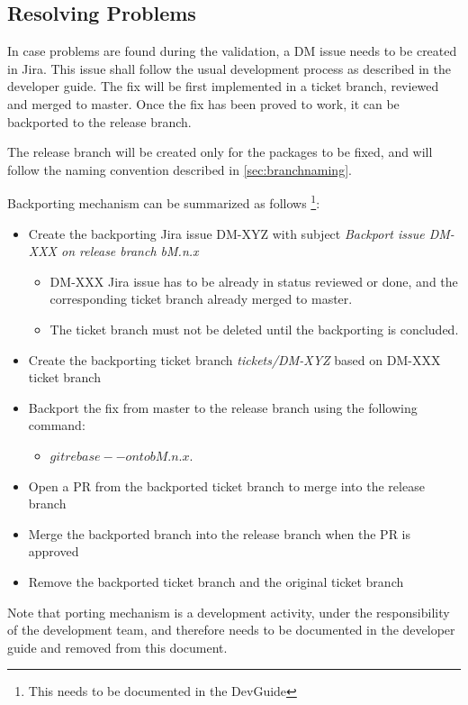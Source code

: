 \subsection{Resolving Problems}

In case problems are found during the validation, a DM issue needs to be created in Jira.
This issue shall follow the usual development process as described in the developer guide.
The fix will be first implemented in a ticket branch, reviewed and merged to master.
Once the fix has been proved to work, it can be backported to the release branch.

The release branch will be created only for the packages to be fixed, and will follow the naming convention described in \ref{sec:branchnaming}.

Backporting mechanism can be summarized as follows \footnote{This needs to be documented in the DevGuide}:


\begin{itemize}
\item Create the backporting Jira issue DM-XYZ with subject \textit{Backport issue DM-XXX on release branch bM.n.x}
  \begin{itemize}
  \item DM-XXX Jira issue has to be already in status reviewed or done, and the corresponding ticket branch already merged to master. 
  \item The ticket branch must not be deleted  until the backporting is concluded.
  \end{itemize}
\item Create the backporting ticket branch \textit{tickets/DM-XYZ}  based on DM-XXX ticket branch
\item Backport the fix from master to the release branch using the following command: 
  \begin{itemize}
   \item $git rebase --onto bM.n.x$.
  \end{itemize}
\item Open a PR from the backported ticket branch to merge into the release branch
\item Merge the backported branch into the release branch when the PR is approved
\item Remove the backported ticket branch and the original ticket branch
\end{itemize}

Note that porting mechanism is a development activity, under the responsibility of the development team, and therefore needs to be documented in the developer guide and removed from this document.

